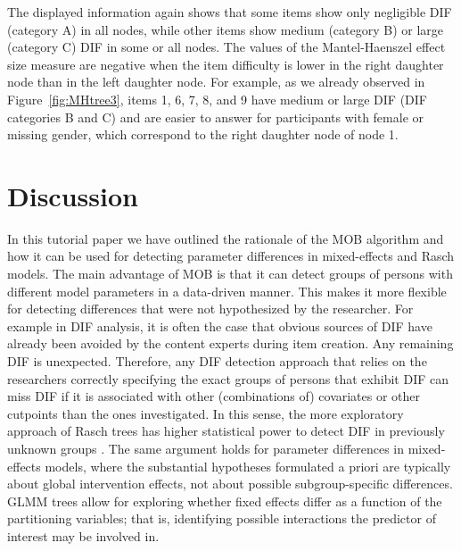\documentclass[doc,floatsintext,natbib]{apa7}
\begin{document}
The displayed information again shows that some items show only negligible DIF (category A) in all nodes, while other items show medium (category B) or large (category C) DIF in some or all nodes. The values of the Mantel-Haenszel effect size measure are negative when the item difficulty is lower in the right daughter node than in the left daughter node. For example, as we already observed in Figure~\ref{fig:MHtree3}, items 1, 6, 7, 8, and 9 have medium or large DIF (DIF categories B and C) and are  easier to answer %
for participants with female or missing gender, which correspond to the right daughter node of node 1. %


\FloatBarrier
\section{Discussion}
\label{discussion}

In this tutorial paper we have outlined the rationale of the MOB algorithm and how it can be used for detecting parameter differences in mixed-effects and Rasch models. The main advantage of MOB is that it can detect groups of persons with different model parameters in a data-driven manner. This makes it more flexible for detecting differences that were not hypothesized by the researcher. For example in DIF analysis, it is often the case that obvious sources of DIF have already been avoided by the content experts during item creation. Any remaining DIF is unexpected. Therefore, any DIF detection approach that relies on the researchers correctly specifying the exact groups of persons that exhibit DIF can miss DIF if it is associated with other (combinations of) covariates or other cutpoints than the ones investigated. In this sense, the more exploratory approach of Rasch trees has higher statistical power to detect DIF in previously unknown groups \citep{StrKopZei:2015:P}. The same argument holds for parameter differences in mixed-effects models, where the substantial hypotheses formulated a priori are typically about global intervention effects, not about possible subgroup-specific differences. GLMM trees allow for exploring whether fixed effects differ as a function of the partitioning variables; that is, identifying possible interactions the predictor of interest may be involved in.
\end{document}
